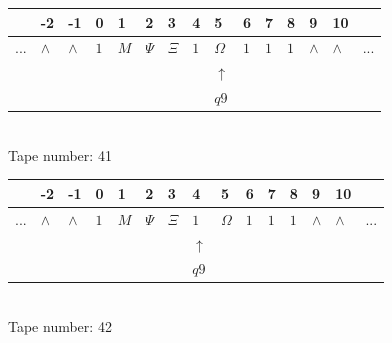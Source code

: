 \documentclass[11pt]{article}
\begin{document}
\begin{table}[H]
\centering
\begin{tabular}{lllllllllllllll}
 & -2 & -1 & 0 & 1 & 2 & 3 & 4 & 5 & 6 & 7 & 8 & 9 & 10 & \\
\hline
$...$ & \multicolumn{1}{|l|}{$\wedge$} & \multicolumn{1}{|l|}{$\wedge$} & \multicolumn{1}{|l|}{$1$} & \multicolumn{1}{|l|}{$M$} & \multicolumn{1}{|l|}{$\Psi$} & \multicolumn{1}{|l|}{$\Xi$} & \multicolumn{1}{|l|}{$1$} & \multicolumn{1}{|l|}{$\Omega$} & \multicolumn{1}{|l|}{$1$} & \multicolumn{1}{|l|}{$1$} & \multicolumn{1}{|l|}{$1$} & \multicolumn{1}{|l|}{$\wedge$} & \multicolumn{1}{|l|}{$\wedge$} & $...$\\
\hline
&  &  &  &  &  &  &  & $\uparrow$ &  &  &  &  &  &  \\
&  &  &  &  &  &  &  & $ q9 $ &  &  &  &  &  &  \\
\end{tabular}
\\
Tape number: 41
\noindent\makebox[\linewidth]{\hdashrule{\textwidth}{1pt}{1pt}}\end{table}
\clearpage

\begin{table}[H]
\centering
\begin{tabular}{lllllllllllllll}
 & -2 & -1 & 0 & 1 & 2 & 3 & 4 & 5 & 6 & 7 & 8 & 9 & 10 & \\
\hline
$...$ & \multicolumn{1}{|l|}{$\wedge$} & \multicolumn{1}{|l|}{$\wedge$} & \multicolumn{1}{|l|}{$1$} & \multicolumn{1}{|l|}{$M$} & \multicolumn{1}{|l|}{$\Psi$} & \multicolumn{1}{|l|}{$\Xi$} & \multicolumn{1}{|l|}{$1$} & \multicolumn{1}{|l|}{$\Omega$} & \multicolumn{1}{|l|}{$1$} & \multicolumn{1}{|l|}{$1$} & \multicolumn{1}{|l|}{$1$} & \multicolumn{1}{|l|}{$\wedge$} & \multicolumn{1}{|l|}{$\wedge$} & $...$\\
\hline
&  &  &  &  &  &  & $\uparrow$ &  &  &  &  &  &  &  \\
&  &  &  &  &  &  & $ q9 $ &  &  &  &  &  &  &  \\
\end{tabular}
\\
Tape number: 42
\noindent\makebox[\linewidth]{\hdashrule{\textwidth}{1pt}{1pt}}\end{table}
\end{document}
